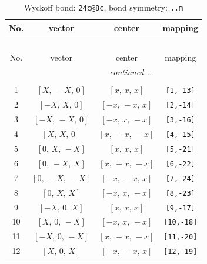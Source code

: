 \documentclass[fleqn,8pt]{jsarticle}
\begin{document}
\begin{longtable}{cccc}
\caption{Wyckoff bond: {\tt 24c@8c}, bond symmetry: {\tt ..m}}
 \\
 \hline \hline
No. & vector & center & mapping \\ \hline \endfirsthead

\multicolumn{3}{l}{\tablename\ \thetable{}} \\
 \hline \hline
No. & vector & center & mapping \\ \hline \endhead

 \hline \hline
\multicolumn{3}{r}{\footnotesize\it continued ...} \\ \endfoot

 \hline \hline
\multicolumn{3}{r}{} \\ \endlastfoot

1 & $\left[ X,\, - X,\, 0 \right]$ & $\left[ x,\, x,\, x \right]$ & {\tt [1,-13]} \\ \hline
2 & $\left[ - X,\, X,\, 0 \right]$ & $\left[ - x,\, - x,\, x \right]$ & {\tt [2,-14]} \\ \hline
3 & $\left[ - X,\, - X,\, 0 \right]$ & $\left[ - x,\, x,\, - x \right]$ & {\tt [3,-16]} \\ \hline
4 & $\left[ X,\, X,\, 0 \right]$ & $\left[ x,\, - x,\, - x \right]$ & {\tt [4,-15]} \\ \hline
5 & $\left[ 0,\, X,\, - X \right]$ & $\left[ x,\, x,\, x \right]$ & {\tt [5,-21]} \\ \hline
6 & $\left[ 0,\, - X,\, X \right]$ & $\left[ x,\, - x,\, - x \right]$ & {\tt [6,-22]} \\ \hline
7 & $\left[ 0,\, - X,\, - X \right]$ & $\left[ - x,\, - x,\, x \right]$ & {\tt [7,-24]} \\ \hline
8 & $\left[ 0,\, X,\, X \right]$ & $\left[ - x,\, x,\, - x \right]$ & {\tt [8,-23]} \\ \hline
9 & $\left[ - X,\, 0,\, X \right]$ & $\left[ x,\, x,\, x \right]$ & {\tt [9,-17]} \\ \hline
10 & $\left[ X,\, 0,\, - X \right]$ & $\left[ - x,\, x,\, - x \right]$ & {\tt [10,-18]} \\ \hline
11 & $\left[ - X,\, 0,\, - X \right]$ & $\left[ x,\, - x,\, - x \right]$ & {\tt [11,-20]} \\ \hline
12 & $\left[ X,\, 0,\, X \right]$ & $\left[ - x,\, - x,\, x \right]$ & {\tt [12,-19]} \\
\end{longtable}
\renewcommand{\arraystretch}{1.2}
\end{document}
